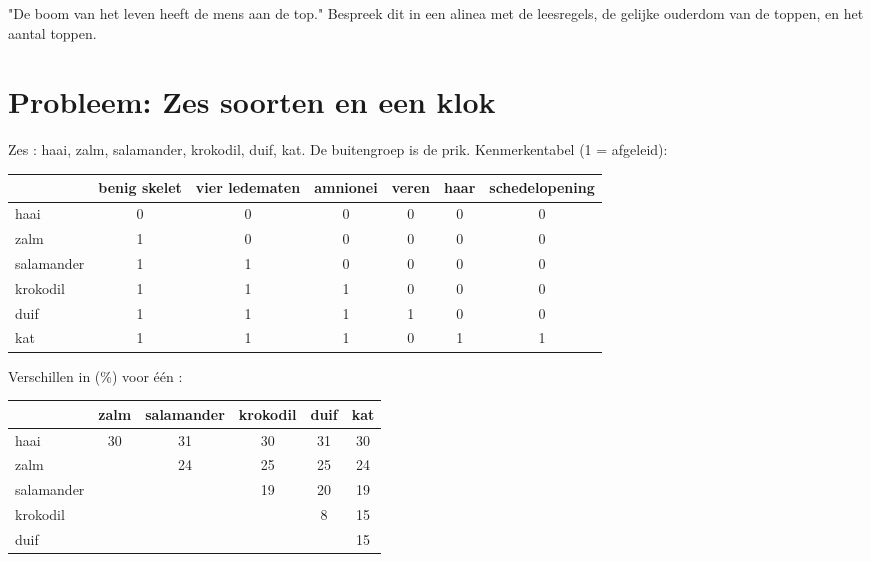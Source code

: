 \begin{exercise}[$\star\star\star$]\label{exo:g12:phylogenetic-trees:15}
"De boom van het leven heeft de mens aan de top." Bespreek dit in een
alinea met de leesregels, de gelijke ouderdom van de toppen, en het aantal
toppen.
\end{exercise}

\section{Probleem: Zes soorten en een klok}

\begin{problem}
\label{pb:g12:phylogenetic-trees:1}
Zes : haai, zalm, salamander, krokodil, duif, kat. De buitengroep
is de prik. Kenmerkentabel (1 = afgeleid):

\begin{center}
\small
\begin{tabular}{lcccccc}
 & benig skelet & vier ledematen & amnionei & veren & haar & schedelopening \\ \hline
haai & 0 & 0 & 0 & 0 & 0 & 0 \\
zalm & 1 & 0 & 0 & 0 & 0 & 0 \\
salamander & 1 & 1 & 0 & 0 & 0 & 0 \\
krokodil & 1 & 1 & 1 & 0 & 0 & 0 \\
duif & 1 & 1 & 1 & 1 & 0 & 0 \\
kat & 1 & 1 & 1 & 0 & 1 & 1 \\
\end{tabular}
\end{center}

Verschillen in  (\%) voor één :

\begin{center}
\begin{tabular}{lccccc}
 & zalm & salamander & krokodil & duif & kat \\ \hline
haai & 30 & 31 & 30 & 31 & 30 \\
zalm & & 24 & 25 & 25 & 24 \\
salamander & & & 19 & 20 & 19 \\
krokodil & & & & 8 & 15 \\
duif & & & & & 15 \\
\end{tabular}
\end{center}


\end{problem}
